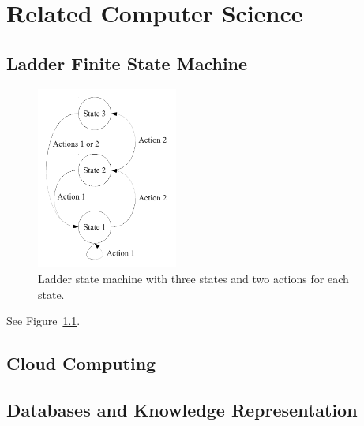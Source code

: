 \chapter{Related Computer Science}

\section{Ladder Finite State Machine}

\begin{figure}[bth]
  \center
  \includegraphics[height=6cm]{gfx/ladder_state_machine}
  \caption[Ladder state machine]{Ladder state machine with three states and two actions for each state.}
  \label{fig:ladder_state_machine}
\end{figure}

See Figure~\ref{fig:ladder_state_machine}.



\section{Cloud Computing}

\section{Databases and Knowledge Representation}

